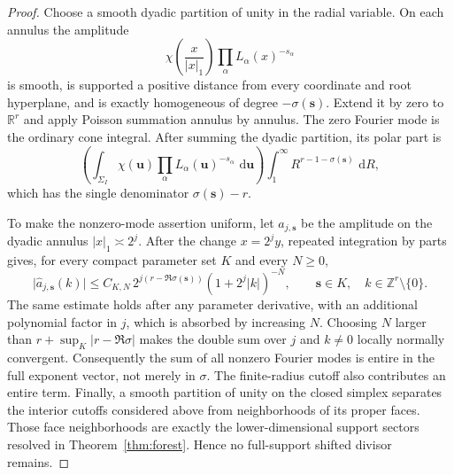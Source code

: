 \documentclass[11pt]{article}
\newcommand{\dd}{\,\mathrm d}
\begin{document}
\begin{proof}
Choose a smooth dyadic partition of unity in the radial variable.  On
each annulus the amplitude
\[
 \chi\!\left(\frac{x}{|x|_1}\right)
 \prod_\alpha L_\alpha(x)^{-s_\alpha}
\]
is smooth, is supported a positive distance from every coordinate and
root hyperplane, and is exactly homogeneous of degree
\(-\sigma(\mathbf s)\).  Extend it by zero to \(\mathbb R^r\) and apply
Poisson summation annulus by annulus.  The zero Fourier mode is the
ordinary cone integral.  After summing the dyadic partition, its polar
part is
\[
 \left(\int_{\Sigma_I}\chi(\mathbf u)
       \prod_\alpha L_\alpha(\mathbf u)^{-s_\alpha}
       \,\dd\mathbf u\right)
 \int_1^\infty R^{r-1-\sigma(\mathbf s)}\,\dd R,
\]
which has the single denominator \(\sigma(\mathbf s)-r\).

To make the nonzero-mode assertion uniform, let \(a_{j,\mathbf s}\)
be the amplitude on the dyadic annulus \(|x|_1\asymp2^j\).  After the
change \(x=2^jy\), repeated integration by parts gives, for every compact
parameter set \(K\) and every \(N\geq0\),
\[
 \bigl|\widehat a_{j,\mathbf s}(k)\bigr|
 \le C_{K,N}\,
 2^{j(r-\Re\sigma(\mathbf s))}
 (1+2^j|k|)^{-N},
 \qquad \mathbf s\in K,\quad k\in\mathbb Z^r\setminus\{0\}.
\]
The same estimate holds after any parameter derivative, with an
additional polynomial factor in \(j\), which is absorbed by increasing
\(N\).  Choosing \(N\) larger than \(r+\sup_K|r-\Re\sigma|\) makes the
double sum over \(j\) and \(k\neq0\) locally normally convergent.
Consequently the sum of all nonzero Fourier modes is entire in the
full exponent vector, not merely in \(\sigma\).  The finite-radius
cutoff also contributes an entire term.
Finally, a smooth partition of unity on the closed simplex separates the
interior cutoffs considered above from neighborhoods of its proper
faces.  Those face neighborhoods are exactly the lower-dimensional
support sectors resolved in Theorem~\ref{thm:forest}.  Hence no
full-support shifted divisor remains.
\end{proof}
\end{document}

